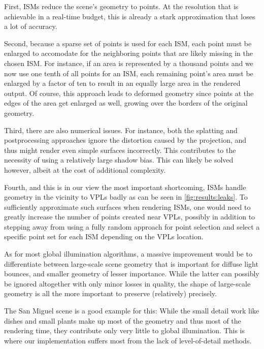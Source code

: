  First, ISMs reduce the scene's geometry to points. At the resolution that is achievable in a real-time budget, this is already a stark approximation that loses a lot of accuracy.

 Second, because a sparse set of points is used for each ISM, each point must be enlarged to accomodate for the neighboring points that are likely missing in the chosen ISM. For instance, if an area is represented by a thousand points and we now use one tenth of all points for an ISM, each remaining point's area must be enlarged by a factor of ten to result in an equally large area in the rendered output. Of course, this approach leads to deformed geometry since points at the edges of the area get enlarged as well, growing over the borders of the original geometry.

 Third, there are also numerical issues. For instance, both the splatting and postprocessing approaches ignore the distortion caused by the projection, and thus might render even simple surfaces incorrectly. This contributes to the necessity of using a relatively large shadow bias. This can likely be solved however, albeit at the cost of additional complexity.

 Fourth, and this is in our view the most important shortcoming, ISMs handle geometry in the vicinity to VPLs badly as can be seen in \cref{fig:results:leaks}. To sufficiently approximate such surfaces when rendering ISMs, one would need to greatly increase the number of points created near VPLs, possibly in addition to stepping away from using a fully random approach for point selection and select a specific point set for each ISM depending on the VPLs location.

 As for most global illumination algorithms, a massive improvement would be to differentiate between large-scale scene geometry that is important for diffuse light bounces, and smaller geometry of lesser importance. While the latter can possibly be ignored altogether with only minor losses in quality, the shape of large-scale geometry is all the more important to preserve (relatively) precisely.

 The San Miguel scene is a good example for this: While the small detail work like dishes and small plants make up most of the geometry and thus most of the rendering time, they contribute only very little to global illumination. This is where our implementation suffers most from the lack of level-of-detail methods.
